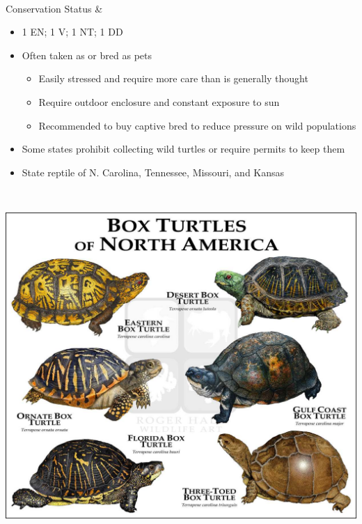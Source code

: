 \begin{center}
\begin{longtabu}
	\\
	\hline
	Conservation Status & 
	\begin{itemize}[noitemsep]
	\item 1 EN; 1 V; 1 NT; 1 DD
	\item Often taken as or bred as pets
		\begin{itemize}[noitemsep]
			\item Easily stressed and require more care than is generally thought
			\item Require outdoor enclosure and constant exposure to sun
			\item Recommended to buy captive bred to reduce pressure on wild populations
		\end{itemize}
	\item Some states prohibit collecting wild turtles or require permits to keep them
	\item State reptile of N. Carolina, Tennessee, Missouri, and Kansas
	\end{itemize}
	\\
	\hline
\end{longtabu}
\includegraphics{testudines/emydidae/terrapene/box}
\end{center}